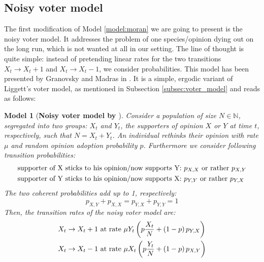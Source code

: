 \documentclass[12pt,a4paper,twoside]{article}
\newtheorem{model}{Model}[section]
\begin{document}
\subsection{Noisy voter model}\label{subsec:noisy_voter_model}
The first modification of Model \ref{model:moran} we are going to present is the noisy voter model. It addresses the problem of one species/opinion dying out on the long run, which is not wanted at all in our setting. The line of thought is quite simple: instead of pretending linear rates for the two transitions $X_t \rightarrow X_t + 1$ and $X_t \rightarrow X_t - 1$, we consider probabilities. This model has been presented by Granovsky and Madras in \cite{Granovsky1995}. It is a simple, ergodic variant of Liggett's voter model, as mentioned in Subsection \ref{subsec:voter_model} and reads as follows:
\begin{model}[\textbf{Noisy voter model by \cite{Granovsky1995}}]\label{model:noisy_voter_model}
	Consider a population of size $N \in \mathbb{N}$, segregated into two groups: $X_t$ and $Y_t$, the supporters of opinion $X$ or $Y$ at time $t$, respectively, such that $N = X_t + Y_t$. An individual rethinks their opinion with rate $\mu$ and random opinion adoption probability $p$. Furthermore we consider following transition probabilities:
	\begin{align}
	\begin{split}\label{def:noisy_probs}
		\textnormal{supporter of X sticks to his opinion/now supports Y:} &\textnormal{  } p_{X,X}\textnormal{ or rather }p_{X,Y}\\
		\textnormal{supporter of Y sticks to his opinion/now supports X:} &\textnormal{  } p_{Y,Y}\textnormal{ or rather }p_{Y,X}
	\end{split}
	\end{align}
	The two coherent probabilities add up to 1, respectively:
	\begin{equation}\label{eq:noisy_probs_add_to_1}
		p_{X,Y} + p_{X,X} = p_{Y,X} + p_{Y,Y} = 1
	\end{equation}
	 Then, the transition rates of the noisy voter model are:
	 \begin{align}\label{def:transition_rates_noisy_voter_model}
	 	\begin{split}
	 	X_t \rightarrow X_t + 1 & \textnormal{ at rate } \mu Y_t\left(p\frac{X_t}{N} + \left(1-p\right) p_{Y,X}\right)\\
	 	X_t \rightarrow X_t - 1 & \textnormal{ at rate } \mu X_t\left(p\frac{Y_t}{N} + \left(1-p\right)p_{X,Y}\right)
	 	\end{split}
	 \end{align}
\end{model}
\end{document}
